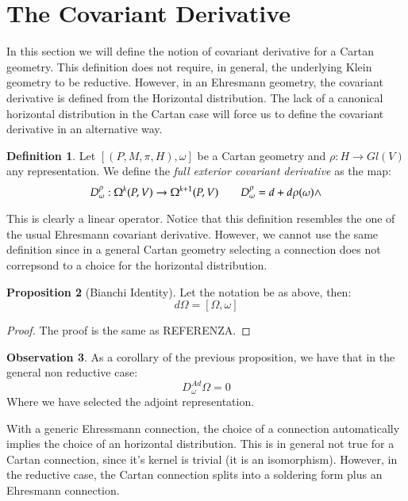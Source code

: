 \documentclass[12pt,a4paper]{report}
\theoremstyle{definition}
\newtheorem{Def}{Definition}[chapter]
\theoremstyle{Theorem}
\newtheorem{Prop}[Def]{Proposition}
\theoremstyle{break}
\theoremstyle{definition}
\newtheorem{Obs}[Def]{Observation}
\begin{document}
	\section{The Covariant Derivative}
	In this section we will define the notion of covariant derivative for a Cartan geometry. This definition does not require, in general, the underlying Klein geometry to be reductive. However, in an Ehresmann geometry, the covariant derivative is defined from the Horizontal distribution. The lack of a canonical horizontal distribution in the Cartan case will force us to define the covariant derivative in an alternative way.
	\begin{Def}
		Let $[(P,M,\pi,H),\omega]$ be a Cartan geometry and $\rho:H\rightarrow Gl(V)$ any representation. We define the \textit{full exterior covariant derivative} as the map:
		$$D_\omega^\rho:\Omega^k(P,V)\rightarrow \Omega^{k+1}(P,V)\hspace{20 pt}D_\omega^\rho=d+d\rho(\omega)\wedge$$
	\end{Def}
	This is clearly a linear operator.
	Notice that this definition resembles the one of the usual Ehresmann covariant derivative. However, we cannot use the same definition since in a general Cartan geometry selecting a connection does not correpsond to a choice for the horizontal distribution.
	\begin{Prop}[Bianchi Identity]
		Let the notation be as above, then:
		$$d\Omega=[\Omega,\omega]$$
	\end{Prop}
	\begin{proof}
		The proof is the same as REFERENZA.
	\end{proof}
	\begin{Obs}
		As a corollary of the previous proposition, we have that in the general non reductive case:
		$$D_\omega^{Ad}\Omega=0$$
		Where we have selected the adjoint representation.
	\end{Obs}
	With a generic Ehressmann connection, the choice of a connection automatically implies the choice of an horizontal distribution. This is in general not true for a Cartan connection, since it's kernel is trivial (it is an isomorphism). However, in the reductive case, the Cartan connection splits into a soldering form plus an Ehresmann connection.
\end{document}
